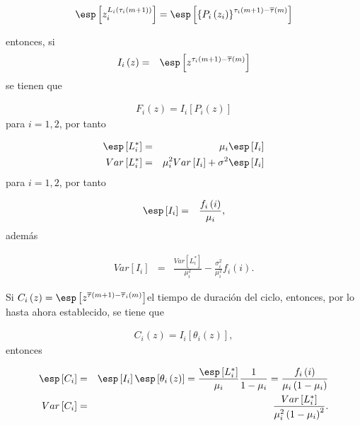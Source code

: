\begin{eqnarray*}
\esp\left[z_{i}^{L_{i}\left(\tau_{i}\left(m+1\right)\right)}\right]=\esp\left[\left\{P_{i}\left(z_{i}\right)\right\}^{\tau_{i}\left(m+1\right)-\overline{\tau}\left(m\right)}\right]
\end{eqnarray*}

entonces, si \begin{eqnarray*}I_{i}\left(z\right)&=&\esp\left[z^{\tau_{i}\left(m+1\right)-\overline{\tau}\left(m\right)}\right]\end{eqnarray*} se tienen que

\begin{eqnarray*}
F_{i}\left(z\right)=I_{i}\left[P_{i}\left(z\right)\right]
\end{eqnarray*}
para $i=1,2$, por tanto



\begin{eqnarray*}
\esp\left[L_{i}^{*}\right]&=&\mu_{i}\esp\left[I_{i}\right]\\
Var\left[L_{i}^{*}\right]&=&\mu_{i}^{2}Var\left[I_{i}\right]+\sigma^{2}\esp\left[I_{i}\right]
\end{eqnarray*}
para $i=1,2$, por tanto


\begin{eqnarray*}
\esp\left[I_{i}\right]&=&\frac{f_{i}\left(i\right)}{\mu_{i}},
\end{eqnarray*}
adem\'as

\begin{eqnarray*}
Var\left[I_{i}\right]&=&\frac{Var\left[L_{i}^{*}\right]}{\mu_{i}^{2}}-\frac{\sigma_{i}^{2}}{\mu_{i}^{2}}f_{i}\left(i\right).
\end{eqnarray*}


Si  $C_{i}\left(z\right)=\esp\left[z^{\overline{\tau}\left(m+1\right)-\overline{\tau}_{i}\left(m\right)}\right]$el tiempo de duraci\'on del ciclo, entonces, por lo hasta ahora establecido, se tiene que

\begin{eqnarray*}
C_{i}\left(z\right)=I_{i}\left[\theta_{i}\left(z\right)\right],
\end{eqnarray*}
entonces

\begin{eqnarray*}
\esp\left[C_{i}\right]&=&\esp\left[I_{i}\right]\esp\left[\theta_{i}\left(z\right)\right]=\frac{\esp\left[L_{i}^{*}\right]}{\mu_{i}}\frac{1}{1-\mu_{i}}=\frac{f_{i}\left(i\right)}{\mu_{i}\left(1-\mu_{i}\right)}\\
Var\left[C_{i}\right]&=&\frac{Var\left[L_{i}^{*}\right]}{\mu_{i}^{2}\left(1-\mu_{i}\right)^{2}}.
\end{eqnarray*}

